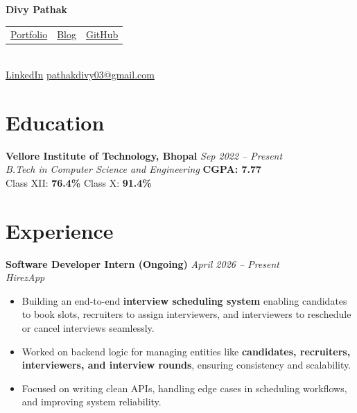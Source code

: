 \documentclass[a4paper,10pt]{article}
\begin{document}
\begin{center}
    {\LARGE \textbf{Divy Pathak}} \\
    \vspace{5pt}
    \begin{tabular}{c@{\hskip 10pt}c@{\hskip 10pt}c}
        \href{https://divydev.xyz}{Portfolio} &
        \href{https://hashnode.com/@divy03}{Blog} &
        \href{https://github.com/divy-03}{GitHub}
    \end{tabular} \\
    \vspace{5pt}
    \href{https://www.linkedin.com/in/pathakdivy03}{LinkedIn} \hspace{10pt}
    \href{mailto:pathakdivy03@gmail.com}{pathakdivy03@gmail.com}
\end{center}

\section*{Education}

\textbf{Vellore Institute of Technology, Bhopal} \hfill \textit{Sep 2022 – Present} \\
\textit{B.Tech in Computer Science and Engineering} \hfill \textbf{CGPA: 7.77} \\[4pt]
Class XII: \textbf{76.4\%}
Class X: \textbf{91.4\%}

\section*{Experience}

\textbf{Software Developer Intern (Ongoing)} \hfill \textit{April 2026 – Present} \\
\textit{HirezApp} \\

\begin{itemize}[leftmargin=0.15in]
    \item Building an end-to-end \textbf{interview scheduling system} enabling candidates to book slots, recruiters to assign interviewers, and interviewers to reschedule or cancel interviews seamlessly.
    \item Worked on backend logic for managing entities like \textbf{candidates, recruiters, interviewers, and interview rounds}, ensuring consistency and scalability.
    \item Focused on writing clean APIs, handling edge cases in scheduling workflows, and improving system reliability.
\end{itemize}
\end{document}
